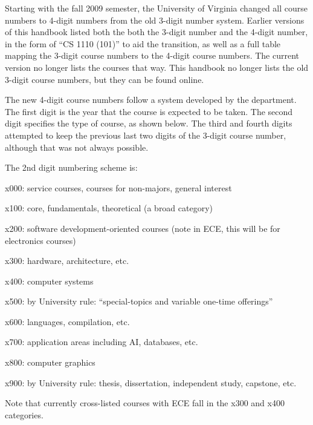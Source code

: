 \label{course-numbering}

Starting with the fall 2009 semester, the University of Virginia
changed all course numbers to 4-digit numbers from the old 3-digit
number system. Earlier versions of this handbook listed both the both
the 3-digit number and the 4-digit number, in the form of ``CS 1110
(101)'' to aid the transition, as well as a full table mapping the
3-digit course numbers to the 4-digit course numbers.  The current
version no longer lists the courses that way.  This handbook no longer
lists the old 3-digit course numbers, but they can be found
online.

The new 4-digit course numbers follow a system developed by the
department. The first digit is the year that the course is expected to
be taken. The second digit specifies the type of course, as shown
below. The third and fourth digits attempted to keep the previous last
two digits of the 3-digit course number, although that was not always
possible.


The 2nd digit numbering scheme is:

\begin{itemlist}
\item x000: service courses, courses for non-majors, general interest
\item x100: core, fundamentals, theoretical (a broad category)
\item x200: software development-oriented courses (note in ECE, this will
 be for electronics courses)
\item x300: hardware, architecture, etc.
\item x400: computer systems
\item x500: by University rule: ``special-topics and variable one-time
 offerings''
\item x600: languages, compilation, etc.
\item x700: application areas including AI, databases, etc.
\item x800: computer graphics
\item x900: by University rule: thesis, dissertation, independent
 study, capstone, etc.
\end{itemlist}

Note that currently cross-listed courses with ECE fall in the x300 and
x400 categories.

\label{sec:degreerevisions}

